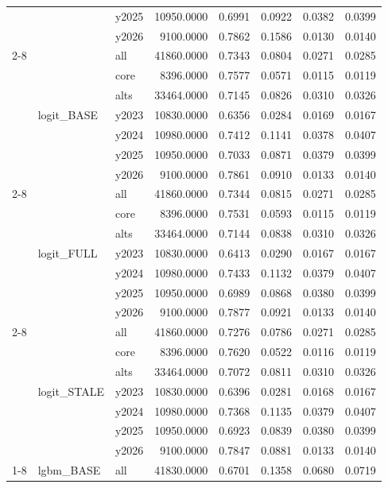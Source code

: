 \begin{tabular}{lllrrrrr}
 &  & y2025 & 10950.0000 & 0.6991 & 0.0922 & 0.0382 & 0.0399 \\
 &  & y2026 & 9100.0000 & 0.7862 & 0.1586 & 0.0130 & 0.0140 \\
\cline{2-8}
 & \multirow[t]{7}{*}{logit_BASE} & all & 41860.0000 & 0.7343 & 0.0804 & 0.0271 & 0.0285 \\
 &  & core & 8396.0000 & 0.7577 & 0.0571 & 0.0115 & 0.0119 \\
 &  & alts & 33464.0000 & 0.7145 & 0.0826 & 0.0310 & 0.0326 \\
 &  & y2023 & 10830.0000 & 0.6356 & 0.0284 & 0.0169 & 0.0167 \\
 &  & y2024 & 10980.0000 & 0.7412 & 0.1141 & 0.0378 & 0.0407 \\
 &  & y2025 & 10950.0000 & 0.7033 & 0.0871 & 0.0379 & 0.0399 \\
 &  & y2026 & 9100.0000 & 0.7861 & 0.0910 & 0.0133 & 0.0140 \\
\cline{2-8}
 & \multirow[t]{7}{*}{logit_FULL} & all & 41860.0000 & 0.7344 & 0.0815 & 0.0271 & 0.0285 \\
 &  & core & 8396.0000 & 0.7531 & 0.0593 & 0.0115 & 0.0119 \\
 &  & alts & 33464.0000 & 0.7144 & 0.0838 & 0.0310 & 0.0326 \\
 &  & y2023 & 10830.0000 & 0.6413 & 0.0290 & 0.0167 & 0.0167 \\
 &  & y2024 & 10980.0000 & 0.7433 & 0.1132 & 0.0379 & 0.0407 \\
 &  & y2025 & 10950.0000 & 0.6989 & 0.0868 & 0.0380 & 0.0399 \\
 &  & y2026 & 9100.0000 & 0.7877 & 0.0921 & 0.0133 & 0.0140 \\
\cline{2-8}
 & \multirow[t]{7}{*}{logit_STALE} & all & 41860.0000 & 0.7276 & 0.0786 & 0.0271 & 0.0285 \\
 &  & core & 8396.0000 & 0.7620 & 0.0522 & 0.0116 & 0.0119 \\
 &  & alts & 33464.0000 & 0.7072 & 0.0811 & 0.0310 & 0.0326 \\
 &  & y2023 & 10830.0000 & 0.6396 & 0.0281 & 0.0168 & 0.0167 \\
 &  & y2024 & 10980.0000 & 0.7368 & 0.1135 & 0.0379 & 0.0407 \\
 &  & y2025 & 10950.0000 & 0.6923 & 0.0839 & 0.0380 & 0.0399 \\
 &  & y2026 & 9100.0000 & 0.7847 & 0.0881 & 0.0133 & 0.0140 \\
\cline{1-8} \cline{2-8}
\multirow[t]{42}{*}{dd10_48h} & \multirow[t]{7}{*}{lgbm_BASE} & all & 41830.0000 & 0.6701 & 0.1358 & 0.0680 & 0.0719 \\

\end{tabular}
